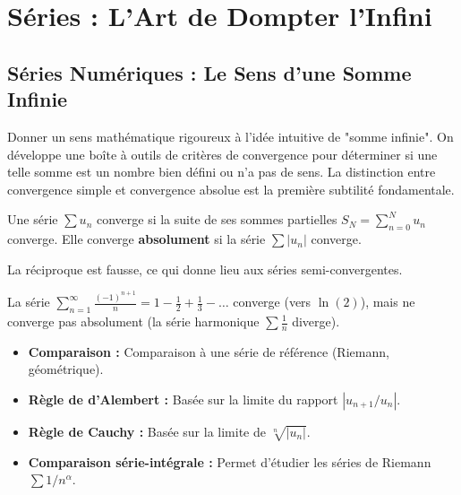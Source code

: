 \chapter{Séries : L'Art de Dompter l'Infini}

\section{Séries Numériques : Le Sens d'une Somme Infinie}

\begin{objectif}
    Donner un sens mathématique rigoureux à l'idée intuitive de "somme infinie". On développe une boîte à outils de critères de convergence pour déterminer si une telle somme est un nombre bien défini ou n'a pas de sens. La distinction entre convergence simple et convergence absolue est la première subtilité fondamentale.
\end{objectif}

\begin{definition}
    Une série $\sum u_n$ converge si la suite de ses sommes partielles $S_N = \sum_{n=0}^N u_n$ converge. Elle converge \textbf{absolument} si la série $\sum |u_n|$ converge.
\end{definition}

\begin{proposition}
    La réciproque est fausse, ce qui donne lieu aux séries semi-convergentes.
\end{proposition}

\begin{example}
    La série $\sum_{n=1}^\infty \frac{(-1)^{n+1}}{n} = 1 - \frac{1}{2} + \frac{1}{3} - \dots$ converge (vers $\ln(2)$), mais ne converge pas absolument (la série harmonique $\sum \frac{1}{n}$ diverge).
\end{example}

\begin{theorem}
    \begin{itemize}
        \item \textbf{Comparaison :} Comparaison à une série de référence (Riemann, géométrique).
        \item \textbf{Règle de d'Alembert :} Basée sur la limite du rapport $|u_{n+1}/u_n|$.
        \item \textbf{Règle de Cauchy :} Basée sur la limite de $\sqrt[n]{|u_n|}$.
        \item \textbf{Comparaison série-intégrale :} Permet d'étudier les séries de Riemann $\sum 1/n^\alpha$.
    \end{itemize}
\end{theorem}

